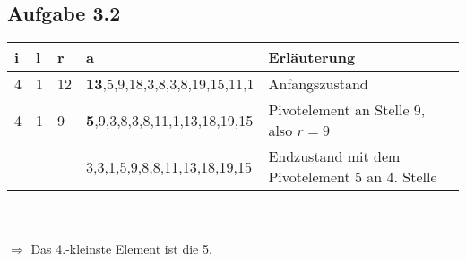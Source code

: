\documentclass{article}
\begin{document}
    \subsection*{Aufgabe 3.2}
    \begin{tabular}{l|l|l|l|l}
        i & l & r & a & Erläuterung\\
        \hline
        4 & 1 & 12 & \textbf{13},5,9,18,3,8,3,8,19,15,11,1 & Anfangszustand \\
        4 & 1 & 9  & \textbf{5},9,3,8,3,8,11,1,13,18,19,15 & Pivotelement an Stelle 9, also $r=9$ \\
         &  &   & 3,3,1,5,9,8,8,11,13,18,19,15 & Endzustand mit dem Pivotelement 5 an 4. Stelle
    \end{tabular}\\\\
    $\Rightarrow$ Das 4.-kleinste Element ist die 5. 
\end{document}
